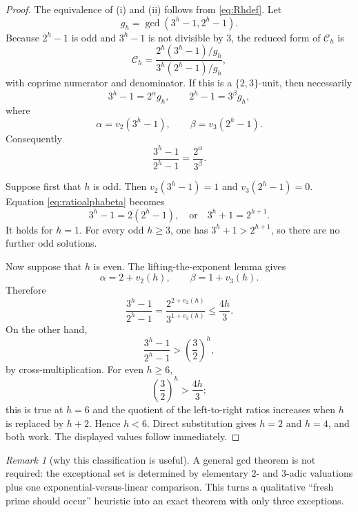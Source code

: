 \documentclass[11pt]{article}
\numberwithin{equation}{section}
\theoremstyle{definition}
\theoremstyle{remark}
\newtheorem{remark}[theorem]{Remark}
\begin{document}
\begin{proof}
The equivalence of (i) and (ii) follows from \eqref{eq:Rhdef}.  Let
\[
  g_h=\gcd(3^h-1,2^h-1).
\]
Because $2^h-1$ is odd and $3^h-1$ is not divisible by $3$, the reduced form of $\mathcal C_h$ is
\begin{equation}\label{eq:Creduced}
  \mathcal C_h
  =\frac{2^h(3^h-1)/g_h}{3^h(2^h-1)/g_h},
\end{equation}
with coprime numerator and denominator.  If this is a $\{2,3\}$-unit, then necessarily
\begin{equation}\label{eq:gparts}
  3^h-1=2^\alpha g_h,
  \qquad
  2^h-1=3^\beta g_h,
\end{equation}
where
\begin{equation}\label{eq:alphabeta}
  \alpha=v_2(3^h-1),
  \qquad
  \beta=v_3(2^h-1).
\end{equation}
Consequently
\begin{equation}\label{eq:ratioalphabeta}
  \frac{3^h-1}{2^h-1}=\frac{2^\alpha}{3^\beta}.
\end{equation}

Suppose first that $h$ is odd.  Then $v_2(3^h-1)=1$ and $v_3(2^h-1)=0$.  Equation \eqref{eq:ratioalphabeta} becomes
\[
  3^h-1=2(2^h-1),
  \quad\text{or}\quad
  3^h+1=2^{h+1}.
\]
It holds for $h=1$.  For every odd $h\ge3$, one has $3^h+1>2^{h+1}$, so there are no further odd solutions.

Now suppose that $h$ is even.  The lifting-the-exponent lemma gives
\begin{equation}\label{eq:LTEvals}
  \alpha=2+v_2(h),
  \qquad
  \beta=1+v_3(h).
\end{equation}
Therefore
\begin{equation}\label{eq:ratioLTE}
  \frac{3^h-1}{2^h-1}
  =\frac{2^{2+v_2(h)}}{3^{1+v_3(h)}}
  \le \frac{4h}{3}.
\end{equation}
On the other hand,
\begin{equation}\label{eq:ratioLower}
  \frac{3^h-1}{2^h-1}>\left(\frac32\right)^h,
\end{equation}
by cross-multiplication.  For even $h\ge6$,
\[
  \left(\frac32\right)^h>\frac{4h}{3};
\]
this is true at $h=6$ and the quotient of the left-to-right ratios increases when $h$ is replaced by $h+2$.  Hence $h<6$.  Direct substitution gives $h=2$ and $h=4$, and both work.  The displayed values follow immediately.
\end{proof}

\begin{remark}[why this classification is useful]
A general gcd theorem is not required: the exceptional set is determined by elementary $2$- and $3$-adic valuations plus one exponential-versus-linear comparison.  This turns a qualitative ``fresh prime should occur'' heuristic into an exact theorem with only three exceptions.
\end{remark}
\end{document}
